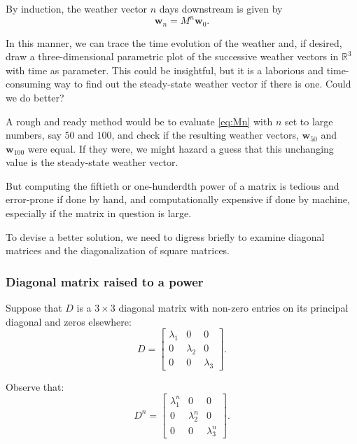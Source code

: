 \documentclass[
  11pt,
  british,
  a4paper,
]{article}
\begin{document}
By induction, the weather vector \(n\) days downstream is given by
\begin{equation}
\symbf{w}_{n} = M^{n}\symbf{w}_{0}.
\label{eq:Mn}\end{equation}

In this manner, we can trace the time evolution of the weather and, if
desired, draw a three-dimensional parametric plot of the successive
weather vectors in \(\mathbb{R}^{3}\) with time as parameter. This could
be insightful, but it is a laborious and time-consuming way to find out
the steady-state weather vector if there is one. Could we do better?

A rough and ready method would be to evaluate \cref{eq:Mn} with \(n\)
set to large numbers, say \(50\) and \(100\), and check if the resulting
weather vectors, \(\symbf{w}_{50}\) and \(\symbf{w}_{100}\) were equal.
If they were, we might hazard a guess that this unchanging value is the
steady-state weather vector.

But computing the fiftieth or one-hunderdth power of a matrix is tedious
and error-prone if done by hand, and computationally expensive if done
by machine, especially if the matrix in question is large.

To devise a better solution, we need to digress briefly to examine
diagonal matrices and the diagonalization of square matrices.

\hypertarget{diagonal-matrix-raised-to-a-power}{%
\subsubsection{Diagonal matrix raised to a
power}\label{diagonal-matrix-raised-to-a-power}}

Suppose that \(D\) is a \(3 \times 3\) diagonal matrix with non-zero
entries on its principal diagonal and zeros elsewhere: \[
D = \begin{bmatrix}
\lambda_{1} & 0 & 0\\
0 & \lambda_{2} & 0\\
0 & 0 & \lambda_{3}
\end{bmatrix}.
\]

Observe that: \begin{equation}
D^{n} = \begin{bmatrix}
\lambda_{1}^{n}& 0 & 0\\
0 & \lambda_{2} ^{n}& 0\\
0 & 0 & \lambda_{3}^{n}
\end{bmatrix}.
\label{eq:D-to-the-n}\end{equation}
\end{document}
